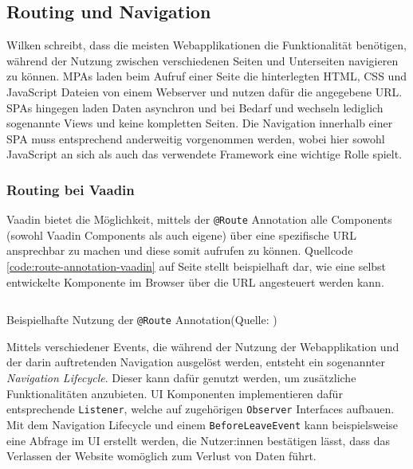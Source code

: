 \documentclass[a4paper,12pt,twoside]{scrreprt}
\begin{document}
\subsection{Routing und Navigation}
\label{sub-sec:routing-navigation}
Wilken schreibt, dass die meisten Webapplikationen die Funktionalität benötigen, während der Nutzung zwischen verschiedenen Seiten und Unterseiten navigieren zu können. \acp{MPA} laden beim Aufruf einer Seite die hinterlegten HTML, \ac{CSS} und JavaScript Dateien von einem Webserver und nutzen dafür die angegebene URL. \acp{SPA} hingegen laden Daten asynchron und bei Bedarf und wechseln lediglich sogenannte Views und keine kompletten Seiten. Die Navigation innerhalb einer \ac{SPA} muss entsprechend anderweitig vorgenommen werden, wobei hier sowohl JavaScript an sich als auch das verwendete Framework eine wichtige Rolle spielt. \parencite[][Seite 159f.]{wilken_angular_2018}

\subsubsection{Routing bei Vaadin}
\label{sub-sub-sec:routing-herangehensweise-vaadin}
Vaadin bietet die Möglichkeit, mittels der \texttt{@Route} Annotation alle Components (sowohl Vaadin Components als auch eigene) über eine spezifische URL ansprechbar zu machen und diese somit aufrufen zu können. Quellcode \ref{code:route-annotation-vaadin} auf Seite    \pageref{code:route-annotation-vaadin} stellt beispielhaft dar, wie eine selbst entwickelte Komponente im Browser über die URL  angesteuert werden kann. \parencite[][Using the @Route Annotation]{vaadin_ltd_overview_2021-1}

\begin{listing}[ht]
    \inputminted[fontsize=\footnotesize,linenos]{java}{code/Vaadin_Route-annotation.java}
    \caption[Beispielhafte Nutzung der \texttt{@Route} Annotation]{Beispielhafte Nutzung der \texttt{@Route} Annotation\newline(Quelle: \cite[][Using the @Route Annotation]{vaadin_ltd_overview_2021-1})}
    \label{code:route-annotation-vaadin}
\end{listing}

Mittels verschiedener Events, die während der Nutzung der Webapplikation und der darin auftretenden Navigation ausgelöst werden, entsteht ein sogenannter \textit{Navigation Lifecycle}. Dieser kann dafür genutzt werden, um zusätzliche Funktionalitäten anzubieten. UI Komponenten implementieren dafür entsprechende \texttt{Listener}, welche auf zugehörigen \texttt{Observer} Interfaces aufbauen. Mit dem Navigation Lifecycle und einem \texttt{BeforeLeaveEvent} kann beispielsweise eine Abfrage im \acl{UI} erstellt werden, die Nutzer:innen bestätigen lässt, dass das Verlassen der Website womöglich zum Verlust von Daten führt. \parencite[][]{vaadin_ltd_navigation_2021}
\end{document}
